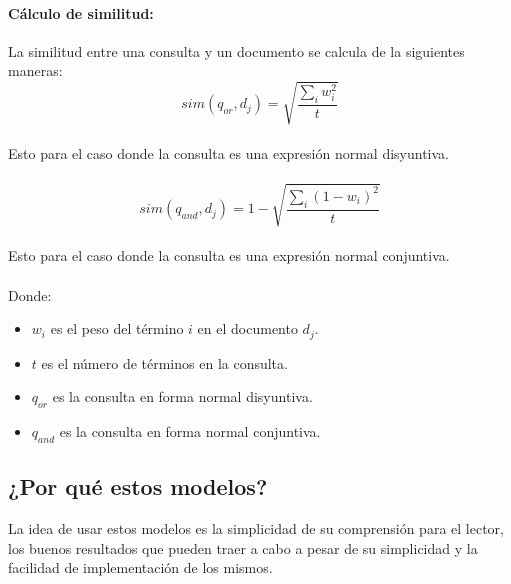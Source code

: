 \documentclass{llncs}
\begin{document}
	\paragraph*{C\'alculo de similitud:}
	La similitud entre una consulta y un documento se calcula de la siguientes maneras:\\
	\begin{equation}
		sim(q_{or},d_{j}) = \sqrt{\frac{\sum_{i}w_{i}^{2}}{t}}
    \end{equation}
	\\
	Esto para el caso donde la consulta es una expresi\'on normal disyuntiva.\\
	\\
	\begin{equation}
		sim(q_{and},d_{j}) = 1 - \sqrt{\frac{\sum_{i}(1 - w_{i})^{2}}{t}}
	\end{equation}
	\\
	Esto para el caso donde la consulta es una expresi\'on normal conjuntiva.\\
	\\
	Donde: \\
	\begin{itemize}
		\item $w_{i}$ es el peso del t\'ermino $i$ en el documento $d_{j}$.
		\item $t$ es el n\'umero de t\'erminos en la consulta.
		\item $q_{or}$ es la consulta en forma normal disyuntiva.
		\item $q_{and}$ es la consulta en forma normal conjuntiva.
	\end{itemize}

	\subsection{¿Por qu\'e estos modelos?}
	La idea de usar estos modelos es la simplicidad de su comprensi\'on para el lector, los buenos resultados que pueden traer 
	a cabo a pesar de su simplicidad y la facilidad de implementaci\'on de los mismos.\\
\end{document}
